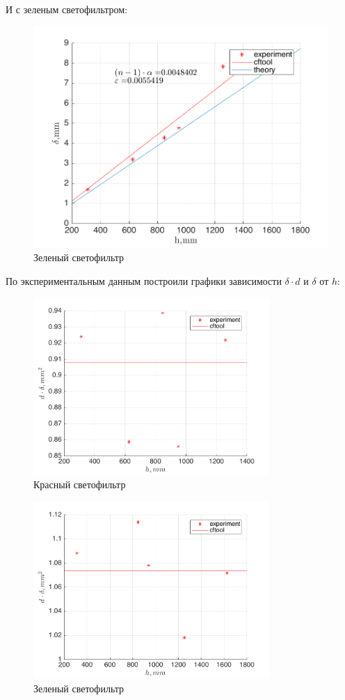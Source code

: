 И с зеленым светофильтром:

\begin{figure}[H]
	\centering
	\includegraphics[width=1\textwidth]{data/d_g.png}
	\caption{Зеленый светофильтр}
	\label{fig:d_g}
\end{figure}


По экспериментальным данным построили графики зависимости $\delta\cdot d$ и $\delta$ от $h$:
\begin{figure}[H]
	\centering
	\includegraphics[width=0.8\textwidth]{data/dd_r.png}
	\caption{Красный светофильтр}
	\label{fig:dd_r}
\end{figure}

\begin{figure}[H]
	\centering
	\includegraphics[width=0.8\textwidth]{data/dd_g.png}
	\caption{Зеленый светофильтр}
	\label{fig:dd_g}
\end{figure}

